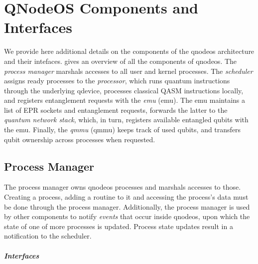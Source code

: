 \chapter{QNodeOS Components and Interfaces}
\label{app:qnodeos}

We provide here additional details on the components of the \acrshort{qnodeos} architecture and
their intefaces.  gives an overview of all the components of
\acrshort{qnodeos}. The \emph{process manager} marshals accesses to all user and kernel processes.
The \emph{scheduler} assigns ready processes to the \emph{processor}, which runs quantum
instructions through the underlying \acrshort{qdevice}, processes classical QASM instructions
locally, and registers entanglement requests with the \emph{\acrlong{emu}} (\acrshort{emu}). The
\acrshort{emu} maintains a list of EPR sockets and entanglement requests, forwards the latter to the
\emph{quantum network stack}, which, in turn, registers available entangled qubits with the
\acrshort{emu}. Finally, the \emph{\acrlong{qmmu}} (\acrshort{qmmu}) keeps track of used qubits, and
transfers qubit ownership across processes when requested.

\section{Process Manager}

The process manager owns \acrshort{qnodeos} processes and marshals accesses to those. Creating a
process, adding a routine to it and accessing the process's data must be done through the process
manager. Additionally, the process manager is used by other components to notify \emph{events} that
occur inside \acrshort{qnodeos}, upon which the state of one of more processes is updated. Process
state updates result in a notification to the scheduler.

\paragraph{Interfaces}

